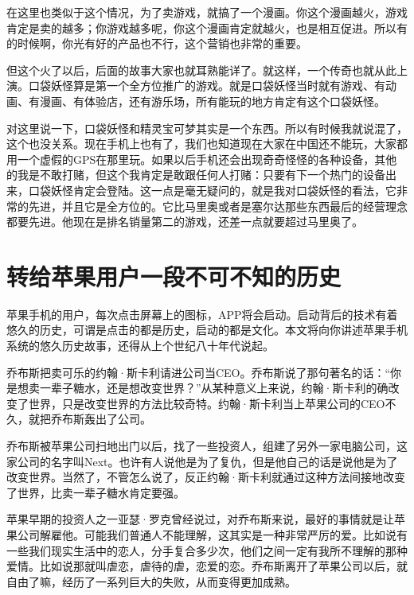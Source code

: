 \documentclass[
  letterpaper,
  DIV=11,
  numbers=noendperiod]{scrreprt}
\begin{document}
在这里也类似于这个情况，为了卖游戏，就搞了一个漫画。你这个漫画越火，游戏肯定是卖的越多；你游戏越多呢，你这个漫画肯定就越火，也是相互促进。所以有的时候啊，你光有好的产品也不行，这个营销也非常的重要。

但这个火了以后，后面的故事大家也就耳熟能详了。就这样，一个传奇也就从此上演。口袋妖怪算是第一个全方位推广的游戏。就是口袋妖怪当时就有游戏、有动画、有漫画、有体验店，还有游乐场，所有能玩的地方肯定有这个口袋妖怪。

对这里说一下，口袋妖怪和精灵宝可梦其实是一个东西。所以有时候我就说混了，这个也没关系。现在手机上也有了，我们也知道现在大家在中国还不能玩，大家都用一个虚假的GPS在那里玩。如果以后手机还会出现奇奇怪怪的各种设备，其他的我是不敢打赌，但这个我肯定是敢跟任何人打赌：只要有下一个热门的设备出来，口袋妖怪肯定会登陆。这一点是毫无疑问的，就是我对口袋妖怪的看法，它非常的先进，并且它是全方位的。它比马里奥或者是塞尔达那些东西最后的经营理念都要先进。他现在是排名销量第二的游戏，还差一点就要超过马里奥了。


\chapter{转给苹果用户一段不可不知的历史}\label{ux8f6cux7ed9ux82f9ux679cux7528ux6237ux4e00ux6bb5ux4e0dux53efux4e0dux77e5ux7684ux5386ux53f2}

苹果手机的用户，每次点击屏幕上的图标，APP将会启动。启动背后的技术有着悠久的历史，可谓是点击的都是历史，启动的都是文化。本文将向你讲述苹果手机系统的悠久历史故事，还得从上个世纪八十年代说起。

乔布斯把卖可乐的约翰·斯卡利请进公司当CEO。乔布斯说了那句著名的话：``你是想卖一辈子糖水，还是想改变世界？''从某种意义上来说，约翰·斯卡利的确改变了世界，只是改变世界的方法比较奇特。约翰·斯卡利当上苹果公司的CEO不久，就把乔布斯轰出了公司。

乔布斯被苹果公司扫地出门以后，找了一些投资人，组建了另外一家电脑公司，这家公司的名字叫Next。也许有人说他是为了复仇，但是他自己的话是说他是为了改变世界。当然了，不管怎么说了，反正约翰·斯卡利就通过这种方法间接地改变了世界，比卖一辈子糖水肯定要强。

苹果早期的投资人之一亚瑟·罗克曾经说过，对乔布斯来说，最好的事情就是让苹果公司解雇他。可能我们普通人不能理解，这其实是一种非常严厉的爱。比如说有一些我们现实生活中的恋人，分手复合多少次，他们之间一定有我所不理解的那种爱情。比如说那就叫虐恋，虐待的虐，恋爱的恋。乔布斯离开了苹果公司以后，就自由了嘛，经历了一系列巨大的失败，从而变得更加成熟。
\end{document}
